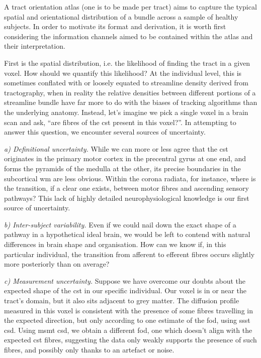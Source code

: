 A tract orientation atlas (one is to be made per tract) aims to capture the typical spatial and orientational distribution of a bundle across a sample of healthy subjects.
In order to motivate its format and derivation, it is worth first considering the information channels aimed to be contained within the atlas and their interpretation.

First is the spatial distribution, i.e. the likelihood of finding the tract in a given voxel.
How should we quantify this likelihood?
At the individual level, this is sometimes conflated with or loosely equated to streamline density derived from tractography, when in reality the relative densities between different portions of a streamline bundle have far more to do with the biases of tracking algorithms than the underlying anatomy.
Instead, let's imagine we pick a single voxel in a brain scan and ask, ``are fibres of the \gls{cst} present in this voxel?''.
In attempting to answer this question, we encounter several sources of uncertainty.

\textit{a) Definitional uncertainty.}
While we can more or less agree that the \gls{cst} originates in the primary motor cortex in the precentral gyrus at one end, and forms the pyramids of the medulla at the other, its precise boundaries in the subcortical \gls{wm} are less obvious.
Within the corona radiata, for instance, where is the transition, if a clear one exists, between motor fibres and ascending sensory pathways?
This lack of highly detailed neurophysiological knowledge is our first source of uncertainty.

\textit{b) Inter-subject variability.}
Even if we could nail down the exact shape of a pathway in a hypothetical ideal brain, we would be left to contend with natural differences in brain shape and organisation.
How can we know if, in this particular individual, the transition from afferent to efferent fibres occurs slightly more posteriorly than on average?

\textit{c) Measurement uncertainty.}
Suppose we have overcome our doubts about the expected shape of the \gls{cst} in our specific individual.
Our voxel is in or near the tract's domain, but it also sits adjacent to grey matter.
The diffusion profile measured in this voxel is consistent with the presence of some fibres travelling in the expected direction, but only according to one estimate of the \gls{fod}, using \gls{ssst} \gls{csd}.
Using \gls{msmt} \gls{csd}, we obtain a different \gls{fod}, one which doesn't align with the expected \gls{cst} fibres, suggesting the data only weakly supports the presence of such fibres, and possibly only thanks to an artefact or noise.

